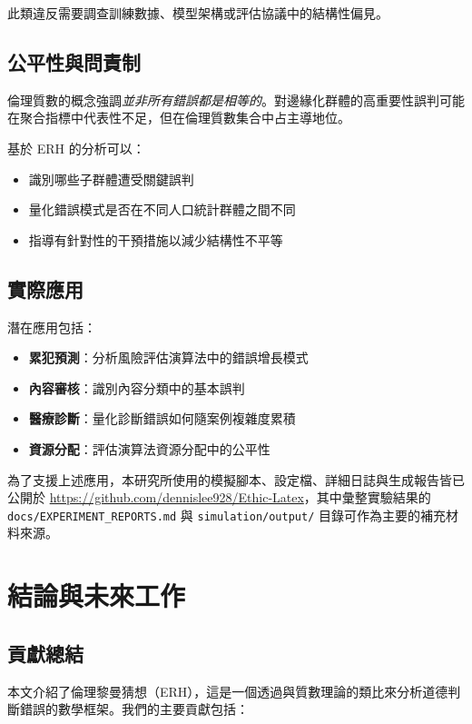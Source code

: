 \documentclass[12pt,a4paper]{article}
\theoremstyle{definition}
\theoremstyle{remark}
\begin{document}
此類違反需要調查訓練數據、模型架構或評估協議中的結構性偏見。

\subsection{公平性與問責制}

倫理質數的概念強調\emph{並非所有錯誤都是相等的}。對邊緣化群體的高重要性誤判可能在聚合指標中代表性不足，但在倫理質數集合中占主導地位。

基於 ERH 的分析可以：
\begin{itemize}
    \item 識別哪些子群體遭受關鍵誤判
    \item 量化錯誤模式是否在不同人口統計群體之間不同
    \item 指導有針對性的干預措施以減少結構性不平等
\end{itemize}

\subsection{實際應用}

潛在應用包括：
\begin{itemize}
    \item \textbf{累犯預測}：分析風險評估演算法中的錯誤增長模式
    \item \textbf{內容審核}：識別內容分類中的基本誤判
    \item \textbf{醫療診斷}：量化診斷錯誤如何隨案例複雜度累積
    \item \textbf{資源分配}：評估演算法資源分配中的公平性
\end{itemize}

為了支援上述應用，本研究所使用的模擬腳本、設定檔、詳細日誌與生成報告皆已公開於 \url{https://github.com/dennislee928/Ethic-Latex}，其中彙整實驗結果的 \texttt{docs/EXPERIMENT\_REPORTS.md} 與 \texttt{simulation/output/} 目錄可作為主要的補充材料來源。

\section{結論與未來工作}
\label{sec:conclusion}

\subsection{貢獻總結}

本文介紹了倫理黎曼猜想（ERH），這是一個透過與質數理論的類比來分析道德判斷錯誤的數學框架。我們的主要貢獻包括：
\end{document}
